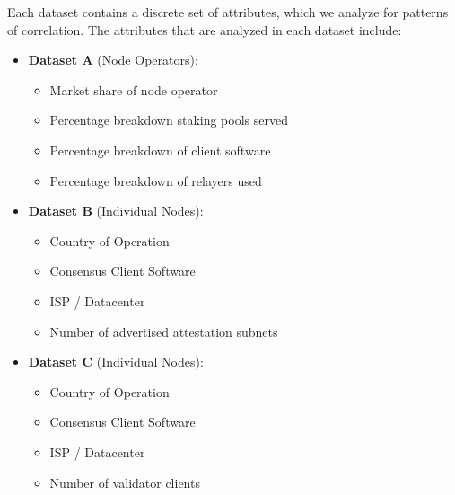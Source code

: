\documentclass[conference]{IEEEtran}
\begin{document}
Each dataset contains a discrete set of attributes, which we analyze for patterns of correlation.  The attributes that are analyzed in each dataset include:

\begin{itemize}
    \item \textbf{Dataset A} (Node Operators):
    \begin{itemize}
        \item Market share of node operator
        \item Percentage breakdown staking pools served
        \item Percentage breakdown of client software
        \item Percentage breakdown of relayers used
    \end{itemize}
    \item \textbf{Dataset B} (Individual Nodes):
            \begin{itemize}
                \item Country of Operation
                \item Consensus Client Software
                \item ISP / Datacenter
                \item Number of advertised attestation subnets
            \end{itemize}
    \item \textbf{Dataset C} (Individual Nodes):
            \begin{itemize}
                \item Country of Operation
                \item Consensus Client Software
                \item ISP / Datacenter
                \item Number of validator clients
            \end{itemize}
\end{itemize}
\end{document}
